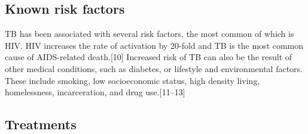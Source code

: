 \documentclass[11pt,twoside]{bristolthesis}
\begin{document}
  \hypertarget{known-risk-factors}{%
  \subsection{Known risk factors}\label{known-risk-factors}}
  
  TB has been associated with several risk factors, the most common of which is HIV. HIV increases the rate of activation by 20-fold and TB is the most common cause of AIDS-related death.{[}10{]} Increased risk of TB can also be the result of other medical conditions, such as diabetes, or lifestyle and environmental factors. These include smoking, low socioeconomic status, high density living, homelessness, incarceration, and drug use.{[}11--13{]}
  
  \hypertarget{treatments}{%
  \subsection{Treatments}\label{treatments}}
  
\end{document}
